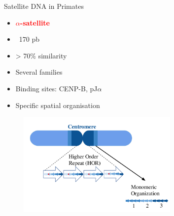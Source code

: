 \documentclass[11pt]{beamer}
\begin{document}
\begin{frame}{Satellite DNA in Primates}
		\begin{itemize}
			\item \textcolor{red}{\textbf{$\alpha$-satellite}}
			\item  ~170 pb
			\item > 70\% similarity  
			\item Several families			
			\item Binding sites: CENP-B, pJ$\alpha$
			\item Specific spatial organisation
		\end{itemize}
		\begin{figure}
			\includegraphics[width=0.7\textwidth]{img/AS_organization.png}
		\end{figure}	
\end{frame}
\end{document}
